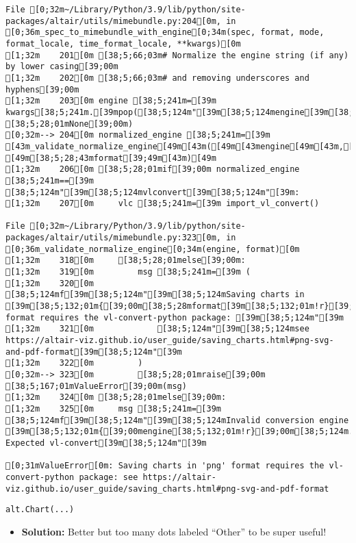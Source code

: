 \documentclass[
  letterpaper,
  DIV=11,
  numbers=noendperiod]{scrartcl}
\providecommand{\tightlist}{%
  \setlength{\itemsep}{0pt}\setlength{\parskip}{0pt}}\usepackage{longtable,booktabs,array}
\begin{document}
\begin{verbatim}
File [0;32m~/Library/Python/3.9/lib/python/site-packages/altair/utils/mimebundle.py:204[0m, in [0;36m_spec_to_mimebundle_with_engine[0;34m(spec, format, mode, format_locale, time_format_locale, **kwargs)[0m
[1;32m    201[0m [38;5;66;03m# Normalize the engine string (if any) by lower casing[39;00m
[1;32m    202[0m [38;5;66;03m# and removing underscores and hyphens[39;00m
[1;32m    203[0m engine [38;5;241m=[39m kwargs[38;5;241m.[39mpop([38;5;124m"[39m[38;5;124mengine[39m[38;5;124m"[39m, [38;5;28;01mNone[39;00m)
[0;32m--> 204[0m normalized_engine [38;5;241m=[39m [43m_validate_normalize_engine[49m[43m([49m[43mengine[49m[43m,[49m[43m [49m[38;5;28;43mformat[39;49m[43m)[49m
[1;32m    206[0m [38;5;28;01mif[39;00m normalized_engine [38;5;241m==[39m [38;5;124m"[39m[38;5;124mvlconvert[39m[38;5;124m"[39m:
[1;32m    207[0m     vlc [38;5;241m=[39m import_vl_convert()

File [0;32m~/Library/Python/3.9/lib/python/site-packages/altair/utils/mimebundle.py:323[0m, in [0;36m_validate_normalize_engine[0;34m(engine, format)[0m
[1;32m    318[0m     [38;5;28;01melse[39;00m:
[1;32m    319[0m         msg [38;5;241m=[39m (
[1;32m    320[0m             [38;5;124mf[39m[38;5;124m"[39m[38;5;124mSaving charts in [39m[38;5;132;01m{[39;00m[38;5;28mformat[39m[38;5;132;01m!r}[39;00m[38;5;124m format requires the vl-convert-python package: [39m[38;5;124m"[39m
[1;32m    321[0m             [38;5;124m"[39m[38;5;124msee https://altair-viz.github.io/user_guide/saving_charts.html#png-svg-and-pdf-format[39m[38;5;124m"[39m
[1;32m    322[0m         )
[0;32m--> 323[0m         [38;5;28;01mraise[39;00m [38;5;167;01mValueError[39;00m(msg)
[1;32m    324[0m [38;5;28;01melse[39;00m:
[1;32m    325[0m     msg [38;5;241m=[39m [38;5;124mf[39m[38;5;124m"[39m[38;5;124mInvalid conversion engine [39m[38;5;132;01m{[39;00mengine[38;5;132;01m!r}[39;00m[38;5;124m. Expected vl-convert[39m[38;5;124m"[39m

[0;31mValueError[0m: Saving charts in 'png' format requires the vl-convert-python package: see https://altair-viz.github.io/user_guide/saving_charts.html#png-svg-and-pdf-format
\end{verbatim}

\begin{verbatim}
alt.Chart(...)
\end{verbatim}

\begin{itemize}
\tightlist
\item
  \textbf{Solution:} Better but too many dots labeled ``Other'' to be
  super useful!
\end{itemize}
\end{document}
